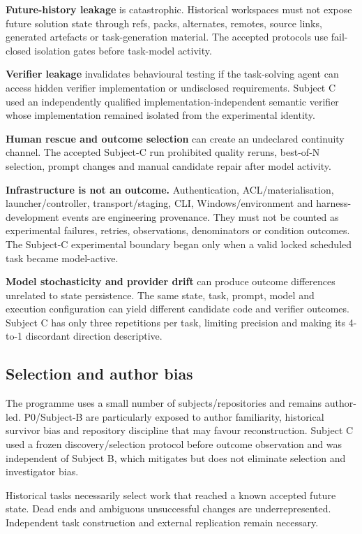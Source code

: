 \textbf{Future-history leakage} is catastrophic. Historical workspaces must not expose future solution state through refs, packs, alternates, remotes, source links, generated artefacts or task-generation material. The accepted protocols use fail-closed isolation gates before task-model activity.

\textbf{Verifier leakage} invalidates behavioural testing if the task-solving agent can access hidden verifier implementation or undisclosed requirements. Subject C used an independently qualified implementation-independent semantic verifier whose implementation remained isolated from the experimental identity.

\textbf{Human rescue and outcome selection} can create an undeclared continuity channel. The accepted Subject-C run prohibited quality reruns, best-of-N selection, prompt changes and manual candidate repair after model activity.

\textbf{Infrastructure is not an outcome.} Authentication, ACL/materialisation, launcher/controller, transport/staging, CLI, Windows/environment and harness-development events are engineering provenance. They must not be counted as experimental failures, retries, observations, denominators or condition outcomes. The Subject-C experimental boundary began only when a valid locked scheduled task became model-active.

\textbf{Model stochasticity and provider drift} can produce outcome differences unrelated to state persistence. The same state, task, prompt, model and execution configuration can yield different candidate code and verifier outcomes. Subject C has only three repetitions per task, limiting precision and making its 4-to-1 discordant direction descriptive.

\subsection{Selection and author bias}

The programme uses a small number of subjects/repositories and remains author-led. P0/Subject-B are particularly exposed to author familiarity, historical survivor bias and repository discipline that may favour reconstruction. Subject C used a frozen discovery/selection protocol before outcome observation and was independent of Subject B, which mitigates but does not eliminate selection and investigator bias.

Historical tasks necessarily select work that reached a known accepted future state. Dead ends and ambiguous unsuccessful changes are underrepresented. Independent task construction and external replication remain necessary.

